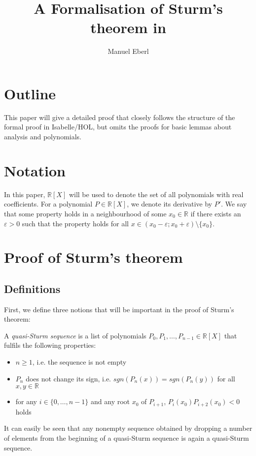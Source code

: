 \documentclass[11pt,a4paper,oneside]{article}
\title{A Formalisation of Sturm's theorem in \isabellehol}
\author{Manuel Eberl}
\newcommand{\RR}{\mathbb{R}}
\renewcommand{\epsilon}{\varepsilon}
\newcommand{\sgn}{\mathit{sgn}}
\newcommand{\isabellehol}{\mbox{Isabelle}\slash HOL\xspace}
\begin{document}
\maketitle
\vskip-3mm
\parindent0mm

\section{Outline}

This paper will give a detailed proof that closely follows the structure of the formal proof in \isabellehol, but omits the proofs for basic lemmas about analysis and polynomials. 

\section{Notation}
In this paper, $\RR[X]$ will be used to denote the set of all polynomials with real coefficients. For a polynomial $P\in\RR[X]$, we denote its derivative by $P'$. We say that some property holds in a neighbourhood of some $x_0\in\RR$ if there exists an $\epsilon > 0$ such that the property holds for all $x\in (x_0-\epsilon;x_0+\epsilon)\setminus\{x_0\}$.


\section{Proof of Sturm's theorem}

\subsection{Definitions}

First, we define three notions that will be important in the proof of Sturm's theorem:

A \emph{quasi-Sturm sequence} is a list of polynomials $P_0,P_1,\ldots,P_{n-1} \in \RR[X]$ that fulfils the following properties:
\begin{itemize}
\item $n \geq 1$, i.e. the sequence is not empty
\item $P_n$ does not change its sign, i.e. $\sgn(P_n(x))=\sgn(P_n(y))$ for all $x,y\in\RR$
\item for any $i\in\{0,\ldots,n-1\}$ and any root $x_0$ of $P_{i+1}$, $P_{i}(x_0)P_{i+2}(x_0) < 0$ holds
\end{itemize}
It can easily be seen that any nonempty sequence obtained by dropping a number of elements from the beginning of a quasi-Sturm sequence is again a quasi-Sturm sequence.\\
\end{document}
